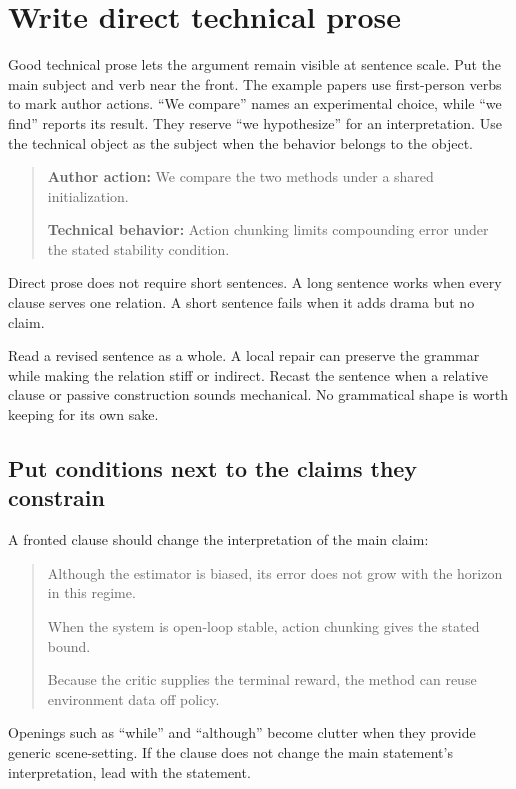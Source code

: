 \section{Write direct technical prose}
\label{sec:sentences}

Good technical prose lets the argument remain visible at sentence scale. Put
the main subject and verb near the front. The example papers use first-person
verbs to mark author actions. ``We compare'' names an experimental
choice, while ``we find'' reports its result. They reserve ``we hypothesize''
for an interpretation. Use the technical object as the subject when the
behavior belongs to the object.

\begin{quote}
\textbf{Author action:} We compare the two methods under a shared
initialization.

\textbf{Technical behavior:} Action chunking limits compounding error under
the stated stability condition.
\end{quote}

Direct prose does not require short sentences. A long sentence works when
every clause serves one relation. A short sentence fails when it adds drama
but no claim.

Read a revised sentence as a whole. A local repair can preserve the grammar
while making the relation stiff or indirect. Recast the sentence when a
relative clause or passive construction sounds mechanical. No grammatical
shape is worth keeping for its own sake.

\subsection{Put conditions next to the claims they constrain}

A fronted clause should change the interpretation of the main claim:

\begin{quote}
Although the estimator is biased, its error does not grow with the horizon in
this regime.

When the system is open-loop stable, action chunking gives the stated bound.

Because the critic supplies the terminal reward, the method can reuse
environment data off policy.
\end{quote}

Openings such as ``while'' and ``although'' become clutter when they provide
generic scene-setting. If the clause does not change the main statement's
interpretation, lead with the statement.

